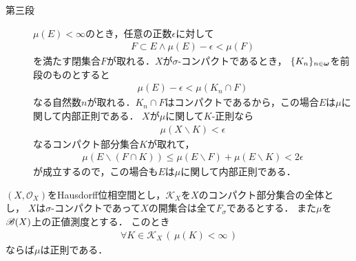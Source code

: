 \begin{sketch}
\begin{description}
				\item[第三段] $\mu(E) < \infty$のとき，任意の正数$\epsilon$に対して
					\begin{align}
						F \subset E \wedge \mu(E) - \epsilon < \mu(F)
					\end{align}
					を満たす閉集合$F$が取れる．$X$が$\sigma$-コンパクトであるとき，
					$\{K_n\}_{n \in {\boldsymbol \omega}}$を前段のものとすると
					\begin{align}
						\mu(E) - \epsilon < \mu(K_n \cap F)
					\end{align}
					なる自然数$n$が取れる．$K_n \cap F$はコンパクトであるから，この場合$E$は$\mu$に関して内部正則である．
					$X$が$\mu$に関して$K$-正則なら
					\begin{align}
						\mu(X \backslash K) < \epsilon
					\end{align}
					なるコンパクト部分集合$K$が取れて，
					\begin{align}
						\mu(E \backslash (F \cap K))
						\leq \mu(E \backslash F) + \mu(E \backslash K)
						< 2\epsilon
					\end{align}
					が成立するので，この場合も$E$は$\mu$に関して内部正則である．
					\QED
			\end{description}
		\end{sketch}
		
		\begin{screen}
			\begin{thm}[正値Borel測度の正則性定理]\label{thm:regularity_theorem_for_positive_Borel_measures}
				$(X,\mathscr{O}_X)$をHausdorff位相空間とし，$\mathscr{K}_X$を$X$のコンパクト部分集合の全体とし，
				$X$は$\sigma$-コンパクトであって$X$の開集合は全て$F_\sigma$であるとする．
				また$\mu$を$\mathscr{B}(X)$上の正値測度とする．
				このとき
				\begin{align}
					\forall K \in \mathscr{K}_X\, \left(\, \mu(K) < \infty\, \right)
				\end{align}
				ならば$\mu$は正則である．
			\end{thm}
		\end{screen}
		
